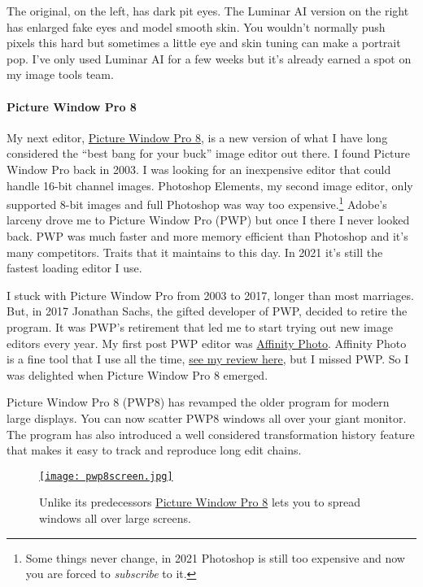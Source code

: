 The original, on the left, has dark pit eyes. The Luminar AI version on
the right has enlarged fake eyes and model smooth skin. You wouldn't
normally push pixels this hard but sometimes a little eye and skin
tuning can make a portrait pop. I've only used Luminar AI for a few
weeks but it's already earned a spot on my image tools team.

\paragraph{Picture Window Pro 8}\label{picture-window-pro-8}

My next editor, \href{https://www.dl-c.com/Downloads.html}{Picture
Window Pro 8}, is a new version of what I have long considered the
``best bang for your buck'' image editor out there. I found Picture
Window Pro back in 2003. I was looking for an inexpensive editor that
could handle 16-bit channel images. Photoshop Elements, my second image
editor, only supported 8-bit images and full Photoshop was way too
expensive.\footnote{Some things never change, in 2021 Photoshop is still too expensive and
  now you are forced to \emph{subscribe} to
  it.} Adobe's larceny
drove me to Picture Window Pro (PWP) but once I there I never looked
back. PWP was much faster and more memory efficient than Photoshop and
it's many competitors. Traits that it maintains to this day. In 2021
it's still the fastest loading editor I use.

I stuck with Picture Window Pro from 2003 to 2017, longer than most
marriages. But, in 2017 Jonathan Sachs, the gifted developer of PWP,
decided to retire the program. It was PWP's retirement that led me to
start trying out new image editors every year. My first post PWP editor
was \href{https://affinity.serif.com/en-gb/photo/}{Affinity Photo}.
Affinity Photo is a fine tool that I use all the time,
\href{https://analyzethedatanotthedrivel.org/2017/01/22/affinity-photo-review/}{see
my review here}, but I missed PWP. So I was delighted when Picture
Window Pro 8 emerged.

Picture Window Pro 8 (PWP8) has revamped the older program for modern
large displays. You can now scatter PWP8 windows all over your giant
monitor. The program has also introduced a well considered
transformation history feature that makes it easy to track and reproduce
long edit chains.


\captionsetup[figure]{labelformat=empty}
 \begin{SCfigure}[50]
 \centering
\href{https://bakerjd99.files.wordpress.com/2021/01/pwp8screen.jpg}{\texttt{[image: pwp8screen.jpg]}}
\caption{Unlike its predecessors \href{https://www.dl-c.com/Downloads.html}{Picture Window Pro 8} lets you to
spread  windows all over large screens.} 
\label{fig:7048X4}
\end{SCfigure}



